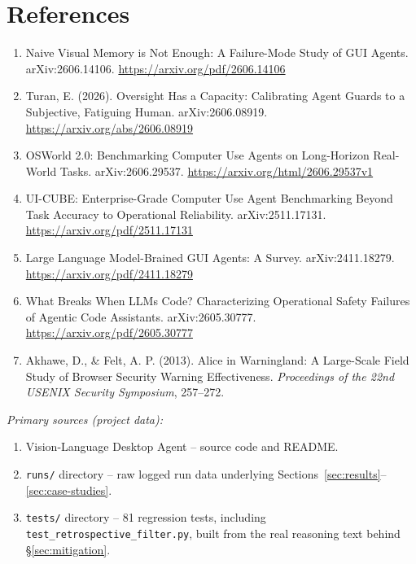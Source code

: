 \documentclass[11pt]{article}
\begin{document}
\section*{References}
\begin{enumerate}[leftmargin=1.6em, itemsep=0.3em]
  \item Naive Visual Memory is Not Enough: A Failure-Mode Study of GUI Agents. arXiv:2606.14106. \url{https://arxiv.org/pdf/2606.14106}
  \item Turan, E. (2026). Oversight Has a Capacity: Calibrating Agent Guards to a Subjective, Fatiguing Human. arXiv:2606.08919. \url{https://arxiv.org/abs/2606.08919}
  \item OSWorld 2.0: Benchmarking Computer Use Agents on Long-Horizon Real-World Tasks. arXiv:2606.29537. \url{https://arxiv.org/html/2606.29537v1}
  \item UI-CUBE: Enterprise-Grade Computer Use Agent Benchmarking Beyond Task Accuracy to Operational Reliability. arXiv:2511.17131. \url{https://arxiv.org/pdf/2511.17131}
  \item Large Language Model-Brained GUI Agents: A Survey. arXiv:2411.18279. \url{https://arxiv.org/pdf/2411.18279}
  \item What Breaks When LLMs Code? Characterizing Operational Safety Failures of Agentic Code Assistants. arXiv:2605.30777. \url{https://arxiv.org/pdf/2605.30777}
  \item Akhawe, D., \& Felt, A. P. (2013). Alice in Warningland: A Large-Scale Field Study of Browser Security Warning Effectiveness. \textit{Proceedings of the 22nd USENIX Security Symposium}, 257--272.
\end{enumerate}
\vspace{0.5em}
\noindent\textit{Primary sources (project data):}
\begin{enumerate}[leftmargin=1.6em, itemsep=0.3em]
  \item Vision-Language Desktop Agent -- source code and README.
  \item \texttt{runs/} directory -- raw logged run data underlying Sections~\ref{sec:results}--\ref{sec:case-studies}.
  \item \texttt{tests/} directory -- 81 regression tests, including \texttt{test\_retrospective\_filter.py}, built from the real reasoning text behind \S\ref{sec:mitigation}.
\end{enumerate}
\end{document}
